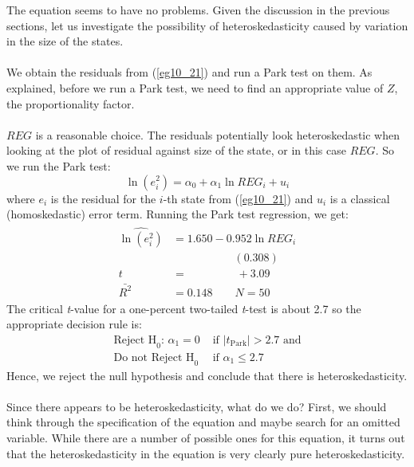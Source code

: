 \documentclass[11pt]{article}
\begin{document}
The equation seems to have no problems. Given the discussion in the previous sections, let us investigate the possibility of heteroskedasticity caused by variation in the size of the states.\\ \\
We obtain the residuals from (\ref{eg10_21}) and run a Park test on them. As explained, before we run a Park test, we need to find an appropriate value of $Z$, the proportionality factor.\\ \\
$REG$ is a reasonable choice. The residuals potentially look heteroskedastic when looking at the plot of residual against size of the state, or in this case $REG$. So we run the Park test:
\begin{equation}
\ln(e_i^2) = \alpha_0 + \alpha_1 \ln REG_i + u_i \label{eg10_22}
\end{equation}
where $e_i$ is the residual for the $i$-th state from (\ref{eg10_21}) and $u_i$ is a classical (homoskedastic) error term. Running the Park test regression, we get:
\begin{align}
\label{eg10_23}
\begin{split}
\widehat{\ln (e_i^2)} &= 1.650 - {0.952\ln REG_i}\\
&\>\>\>\>\>\>\>\>\>\>\>\>\>\>\>\>\>\>\>\>\>\>\>\>\> (0.308)\\
t&=\>\>\>\>\>\>\>\>\>\>\>\>\>\>\>\>\>\>\>\> +3.09\\
\bar{R^2}&= 0.148 \quad\quad N=50
\end{split}
\end{align}
The critical \textit{t}-value for a one-percent two-tailed \textit{t}-test is about 2.7 so the appropriate decision rule is:
\begin{align*}
 \text{Reject H}_0 \text{: }\alpha_1 = 0 &\text{ if } |t_{\text{Park}}| > 2.7 \text { and}\\ 
 \text{Do not Reject H}_\text{0} & \text { if } \alpha_1 \leq 2.7
\end{align*}
Hence, we reject the null hypothesis and conclude that there is heteroskedasticity.\\ \\
Since there appears to be heteroskedasticity, what do we do? First, we should think through the specification of the equation and maybe search for an omitted variable. While there are a number of possible ones for this equation, it turns out that the heteroskedasticity in the equation is very clearly pure heteroskedasticity.\\ \\
\end{document}
